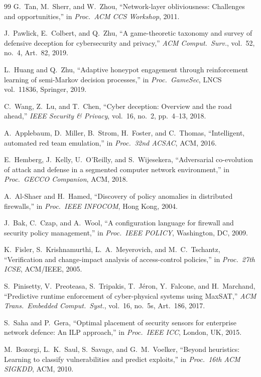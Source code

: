 \documentclass[journal]{IEEEtran}
\begin{document}
\begin{thebibliography}{99}
G.~Tan, M.~Sherr, and W.~Zhou,
``Network-layer obliviousness: Challenges and opportunities,''
in \emph{Proc.\ ACM CCS Workshop}, 2011.

J.~Pawlick, E.~Colbert, and Q.~Zhu,
``A game-theoretic taxonomy and survey of defensive deception for
cybersecurity and privacy,''
\emph{ACM Comput.\ Surv.}, vol.~52, no.~4, Art.~82, 2019.

L.~Huang and Q.~Zhu,
``Adaptive honeypot engagement through reinforcement learning of
semi-Markov decision processes,''
in \emph{Proc.\ GameSec}, LNCS vol.~11836, Springer, 2019.

C.~Wang, Z.~Lu, and T.~Chen,
``Cyber deception: Overview and the road ahead,''
\emph{IEEE Security \& Privacy}, vol.~16, no.~2,
pp.~4--13, 2018.

A.~Applebaum, D.~Miller, B.~Strom, H.~Foster, and C.~Thomas,
``Intelligent, automated red team emulation,''
in \emph{Proc.\ 32nd ACSAC}, ACM, 2016.

E.~Hemberg, J.~Kelly, U.~O'Reilly, and S.~Wijesekera,
``Adversarial co-evolution of attack and defense in a segmented
computer network environment,''
in \emph{Proc.\ GECCO Companion}, ACM, 2018.

A.~Al-Shaer and H.~Hamed,
``Discovery of policy anomalies in distributed firewalls,''
in \emph{Proc.\ IEEE INFOCOM}, Hong Kong, 2004.

J.~Bak, C.~Czap, and A.~Wool,
``A configuration language for firewall and security policy
management,''
in \emph{Proc.\ IEEE POLICY}, Washington, DC, 2009.

K.~Fisler, S.~Krishnamurthi, L.~A.~Meyerovich, and
M.~C.~Tschantz,
``Verification and change-impact analysis of access-control
policies,''
in \emph{Proc.\ 27th ICSE}, ACM/IEEE, 2005.

S.~Pinisetty, V.~Preoteasa, S.~Tripakis, T.~J\'eron,
Y.~Falcone, and H.~Marchand,
``Predictive runtime enforcement of cyber-physical systems using
MaxSAT,''
\emph{ACM Trans.\ Embedded Comput.\ Syst.}, vol.~16, no.~5s,
Art.~186, 2017.

S.~Saha and P.~Gera,
``Optimal placement of security sensors for enterprise network
defence: An ILP approach,''
in \emph{Proc.\ IEEE ICC}, London, UK, 2015.

M.~Bozorgi, L.~K.~Saul, S.~Savage, and G.~M.~Voelker,
``Beyond heuristics: Learning to classify vulnerabilities and
predict exploits,''
in \emph{Proc.\ 16th ACM SIGKDD}, ACM, 2010.


\end{thebibliography}
\end{document}
